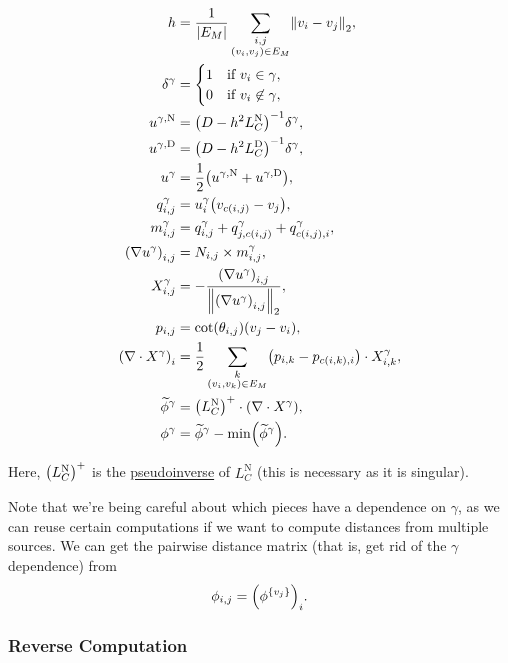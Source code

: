 \begin{align*}
	h &= \frac{1}{\abs{E_M}}\sum_{\substack{i, j \\ \pof{v_i, v_j} \in E_M}}\norm{v_i - v_j}_2, \\
	\delta^\gamma &= \begin{cases}
		1 & \text{if \(v_i \in \gamma\)}, \\
		0 & \text{if \(v_i \not\in \gamma\)},
	\end{cases} \\
	u^{\gamma, \text{N}} &= \pof{D - h^2L_C^{\text{N}}}^{-1}\delta^\gamma, \\
	u^{\gamma, \text{D}} &= \pof{D - h^2L_C^{\text{D}}}^{-1}\delta^\gamma, \\
	u^\gamma &= \frac{1}{2}\pof{u^{\gamma, \text{N}} + u^{\gamma, \text{D}}}, \\
	q^\gamma_{i, j} &= u^\gamma_i\pof{v_{c\pof{i, j}} - v_j}, \\
	m^\gamma_{i, j} &= q^\gamma_{i, j} + q^\gamma_{j, c\pof{i, j}} + q^\gamma_{c\pof{i, j}, i}, \\
	\pof{\nabla u^\gamma}_{i, j} &= N_{i, j} \times m^\gamma_{i, j}, \\
	X^\gamma_{i, j} &= -\frac{\pof{\nabla u^\gamma}_{i, j}}{\norm{\pof{\nabla u^\gamma}_{i, j}}_2}, \\
	p_{i, j} &= \cot\pof{\theta_{i, j}}\pof{v_j - v_i}, \\
	\pof{\nabla \cdot X^\gamma}_i &= \frac{1}{2}\sum_{\substack{k \\ \pof{v_i, v_k} \in E_M}}\pof{p_{i, k} - p_{c\pof{i, k}, i}} \cdot X^\gamma_{i, k}, \\
	\widetilde{\phi}^\gamma &= \pof{L_C^{\text{N}}}^+ \cdot \pof{\nabla \cdot X^\gamma}, \\
	\phi^\gamma &= \widetilde{\phi}^\gamma - \min\pof{\widetilde{\phi}^\gamma}.
\end{align*}

Here, \(\pof{L_C^{\text{N}}}^+\) is the \href{https://en.wikipedia.org/wiki/Moore%E2%80%93Penrose_inverse}{pseudoinverse} of \(L_C^{\text{N}}\) (this is necessary as it is singular).

Note that we're being careful about which pieces have a dependence on \(\gamma\), as we can reuse certain computations if we want to compute distances from multiple sources. We can get the pairwise distance matrix (that is, get rid of the \(\gamma\) dependence) from \[\phi_{i, j} = \pof{\phi^{\cof{v_j}}}_i.\]

\subsubsection{Reverse Computation}

